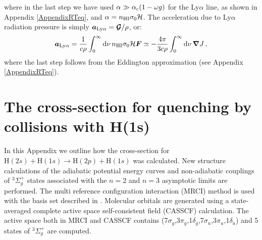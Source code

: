\documentclass[fleqn,usenatbib]{mnras}
\begin{document}
where in the last step we have used $\alpha \gg \alpha_{\rm c}(1 - \omega g)$ for the Ly$\alpha$ line, as shown in Appendix \ref{AppendixRTeq}, and $\alpha = n_{\rm HI} \sigma_0 \mathcal{H}$. The acceleration due to Ly$\alpha$ radiation pressure is simply $\boldsymbol{a}_{\rm Ly\alpha} = \boldsymbol{\mathcal{G}}/\rho$, or: 
\begin{equation}
    \boldsymbol{a}_{\rm Ly\alpha} = \dfrac{1}{c \rho} \int_{0}^{\infty} \textrm{d}\nu \, n_{\rm HI} \sigma_0 \mathcal{H} \boldsymbol{F} \simeq - \dfrac{4\pi}{3c \rho} \int_{0}^{\infty} \textrm{d}\nu \, \boldsymbol{\nabla} J \, ,
\end{equation}
where the last step follows from the Eddington approximation (see Appendix \ref{AppendixRTeq}). 


\section{The cross-section for quenching by collisions with H(1s)}
\label{Appendix H(2s) cross section}

In this Appendix we outline how the cross-section for $\textrm{H}(2s)+\textrm{H}(1s) \rightarrow \textrm{H}(2p)+\textrm{H}(1s)$ was calculated. New structure calculations of the adiabatic potential energy curves and non-adiabatic couplings of $^3\Sigma^+_g$ states associated with the $n=2$ and $n=3$ asymptotic limits are performed. The multi reference configuration interaction (MRCI) method is used with the basis set described in \cite{stenrup2009}. Molecular orbitals are generated using a state-averaged complete active space self-consistent field (CASSCF) calculation. The active space both in MRCI and CASSCF contains (7$\sigma_g$,3$\pi_g$,1$\delta_g$,7$\sigma_u$,3$\pi_u$,1$\delta_u$) and 5 states of $^3\Sigma^+_g$ are computed.
\end{document}
